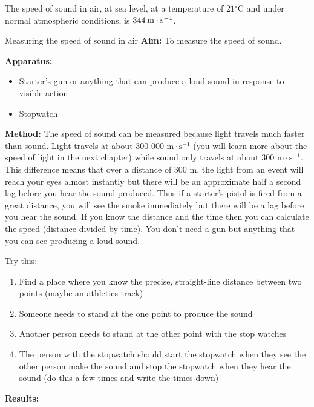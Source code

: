  { \label{m38799*meaningfhsst!!!underscore!!!id164}
     The speed of sound in air, at sea level, at a temperature of $21{}^{\circ }\text{C}$ and under normal atmospheric conditions, is $344\phantom{\rule{2pt}{0ex}}\text{m}\ensuremath{\cdot}\text{s}{}^{-1}$. 
       } 

\begin{i_experiment}{Measuring the speed of sound in air}
\textbf{Aim:} To measure the speed of sound.

\textbf{Apparatus:} 
\begin{itemize}
 \item Starter's gun or anything that can produce a loud sound in response to visible action
  \item Stopwatch
  \end{itemize}

\textbf{Method:} The speed of sound can be measured because light travels much faster than sound. Light travels at about 300 000 $\text{m}\cdot\text{s}^{-1}$ (you will learn more about the speed of light in the next chapter) while sound only travels at about 300 $\text{m}\cdot\text{s}^{-1}$.  This difference means that over a distance of 300 $\text{m}$, the light from an event will reach your eyes almost instantly but there will be an approximate half a second lag before you hear the sound produced.  Thus if a starter's pistol is fired from a great distance, you will see the smoke immediately but there will be a lag before you hear the sound.  If you know the distance and the time then you can calculate the speed (distance divided by time). You don't need a gun but anything that you can see producing a loud sound.

Try this:
\begin{enumerate}[noitemsep, label=\textbf{\arabic*}. ] 
\item Find a place where you know the precise, straight-line distance between two points (maybe an athletics track)
\item Someone needs to stand at the one point to produce the sound 
\item Another person needs to stand at the other point with the stop watches
\item The person with the stopwatch should start the stopwatch when they see the other person make the sound and stop the stopwatch when they hear the sound (do this a few times and write the times down)
\end{enumerate}
\textbf{Results:}


\end{i_experiment}
